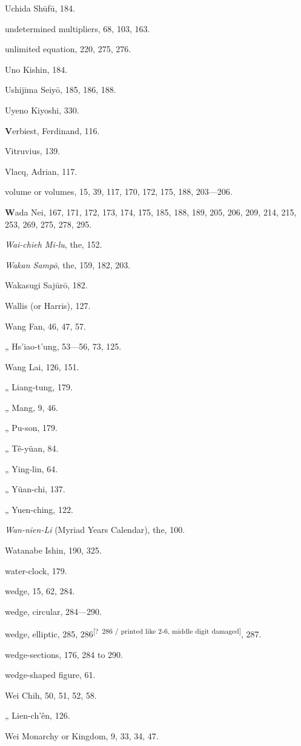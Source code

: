 \documentclass[11pt]{article}
\newcommand{\unclear}[1]{\textsuperscript{[?~#1]}}
\begin{document}
Uchida Shūfū, 184.\par
undetermined multipliers, 68, 103, 163.\par
unlimited equation, 220, 275, 276.\par
Uno Kishin, 184.\par
Ushijima Seiyō, 185, 186, 188.\par
Uyeno Kiyoshi, 330.\par
\medskip
\textbf{V}erbiest, Ferdinand, 116.\par
Vitruvius, 139.\par
Vlacq, Adrian, 117.\par
volume or volumes, 15, 39, 117, 170, 172, 175, 188, 203—206.\par
\medskip
\textbf{W}ada Nei, 167, 171, 172, 173, 174, 175, 185, 188, 189, 205, 206, 209, 214, 215, 253, 269, 275, 278, 295.\par
\emph{Wai-chieh Mi-lu}, the, 152.\par
\emph{Wakan Sampō}, the, 159, 182, 203.\par
Wakasugi Sajūrō, 182.\par
Wallis (or Harris), 127.\par
Wang Fan, 46, 47, 57.\par
\quad „ Hs'iao-t'ung, 53—56, 73, 125.\par
Wang Lai, 126, 151.\par
\quad „ Liang-tung, 179.\par
\quad „ Mang, 9, 46.\par
\quad „ Pu-son, 179.\par
\quad „ Tê-yüan, 84.\par
\quad „ Ying-lin, 64.\par
\quad „ Yüan-chi, 137.\par
\quad „ Yuen-ching, 122.\par
\emph{Wan-nien-Li} (Myriad Years Calendar), the, 100.\par
Watanabe Ishin, 190, 325.\par
water-clock, 179.\par
wedge, 15, 62, 284.\par
wedge, circular, 284—290.\par
wedge, elliptic, 285, 286\unclear{286 / printed like 2-6, middle digit damaged}, 287.\par
wedge-sections, 176, 284 to 290.\par
wedge-shaped figure, 61.\par
Wei Chih, 50, 51, 52, 58.\par
\quad „ Lien-ch'ên, 126.\par
Wei Monarchy or Kingdom, 9, 33, 34, 47.\par
\end{document}
